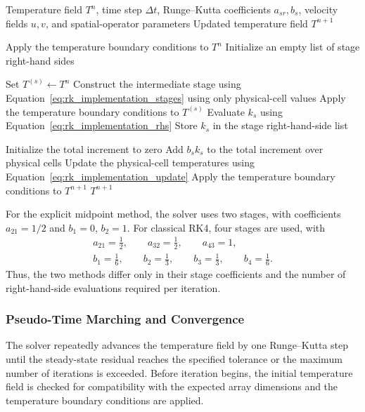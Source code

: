 \begin{algorithm}[H]
\caption{One Explicit Runge--Kutta Time Step}
\label{alg:rk_single_step}
\begin{algorithmic}[1]
\Require Temperature field $T^n$, time step $\Delta t$,
Runge--Kutta coefficients $a_{sr},b_s$, velocity fields
$u,v$, and spatial-operator parameters
\Ensure Updated temperature field $T^{n+1}$

\State Apply the temperature boundary conditions to $T^n$
\State Initialize an empty list of stage right-hand sides

    \State Set $T^{(s)}\gets T^n$
        \State Construct the intermediate stage using
        Equation~\eqref{eq:rk_implementation_stages}
        using only physical-cell values
    \EndIf
    \State Apply the temperature boundary conditions to $T^{(s)}$
    \State Evaluate $k_s$ using
    Equation~\eqref{eq:rk_implementation_rhs}
    \State Store $k_s$ in the stage right-hand-side list
\EndFor

\State Initialize the total increment to zero
    \State Add $b_s k_s$ to the total increment
    over physical cells
\EndFor
\State Update the physical-cell temperatures using
Equation~\eqref{eq:rk_implementation_update}
\State Apply the temperature boundary conditions to $T^{n+1}$
\State \Return $T^{n+1}$
\end{algorithmic}
\end{algorithm}

For the explicit midpoint method, the solver uses two stages,
with coefficients $a_{21}=1/2$ and $b_1=0$, $b_2=1$.
For classical RK4, four stages are used, with
\[
\begin{gathered}
a_{21}=\frac12,\qquad
a_{32}=\frac12,\qquad
a_{43}=1,\\
b_1=\frac16,\qquad
b_2=\frac13,\qquad
b_3=\frac13,\qquad
b_4=\frac16.
\end{gathered}
\]
Thus, the two methods differ only in their stage coefficients
and the number of right-hand-side evaluations required per
iteration.

\subsubsection{Pseudo-Time Marching and Convergence}

The solver repeatedly advances the temperature field by one
Runge--Kutta step until the steady-state residual reaches the
specified tolerance or the maximum number of iterations is
exceeded. Before iteration begins, the initial temperature
field is checked for compatibility with the expected array
dimensions and the temperature boundary conditions are
applied.

